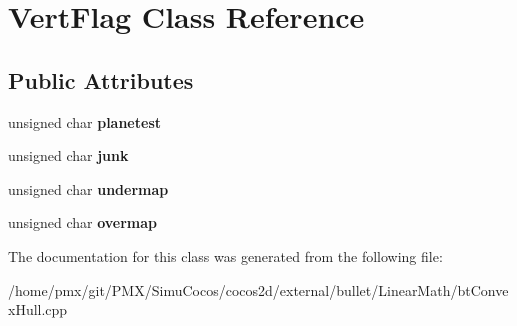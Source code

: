 \hypertarget{classVertFlag}{}\section{Vert\+Flag Class Reference}
\label{classVertFlag}
\subsection*{Public Attributes}
\begin{DoxyCompactItemize}
\item 
\mbox{\label{classVertFlag_afb68cbf59355c7f55a3c838e3cea9acb}} 
unsigned char {\bfseries planetest}
\item 
\mbox{\label{classVertFlag_a4b4586a5ab224c9e1bd9510a1cb33bf5}} 
unsigned char {\bfseries junk}
\item 
\mbox{\label{classVertFlag_a5fa870fd2c86733247f5f5a05a2fc846}} 
unsigned char {\bfseries undermap}
\item 
\mbox{\label{classVertFlag_a9f27902db81631794f6a7560b2999a5b}} 
unsigned char {\bfseries overmap}
\end{DoxyCompactItemize}


The documentation for this class was generated from the following file\+:\begin{DoxyCompactItemize}
\item 
/home/pmx/git/\+P\+M\+X/\+Simu\+Cocos/cocos2d/external/bullet/\+Linear\+Math/bt\+Convex\+Hull.\+cpp\end{DoxyCompactItemize}

